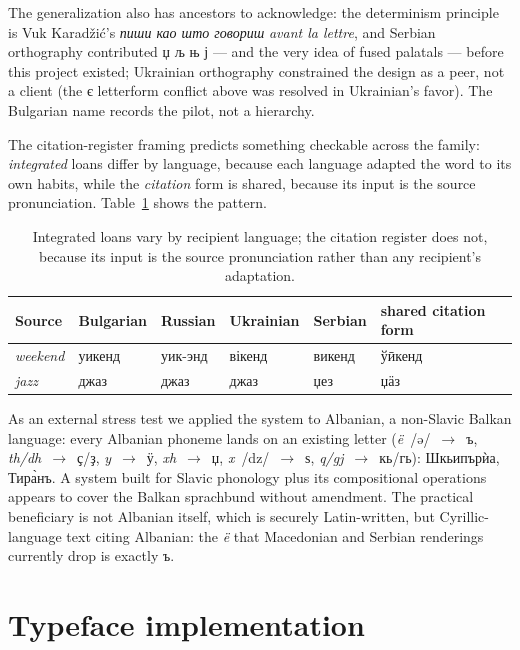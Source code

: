 \documentclass[11pt]{article}
\newcommand{\cz}[1]{{\chu #1}}
\newcommand{\ph}[1]{{\ipafont/#1/}}
\begin{document}
The generalization also has ancestors to acknowledge: the determinism principle is Vuk Karad\v{z}i\'c's \emph{пиши као што говориш} \emph{avant la lettre}, and Serbian orthography contributed \cz{џ љ њ ј} — and the very idea of fused palatals — before this project existed; Ukrainian orthography constrained the design as a peer, not a client (the є letterform conflict above was resolved in Ukrainian's favor). The Bulgarian name records the pilot, not a hierarchy.

The citation-register framing predicts something checkable across the family: \emph{integrated} loans differ by language, because each language adapted the word to its own habits, while the \emph{citation} form is shared, because its input is the source pronunciation. Table~\ref{tab:multibase} shows the pattern.

\begin{table}[ht]\centering\small
\begin{tabular}{llllll}
\toprule
Source & Bulgarian & Russian & Ukrainian & Serbian & shared citation form \\
\midrule
\emph{weekend} & \cz{уикенд} & \cz{уик-энд} & \cz{вікенд} & \cz{викенд} & \cz{ўӣкенд} \\
\emph{jazz} & \cz{джаз} & \cz{джаз} & \cz{джаз} & \cz{џез} & \cz{џӓз} \\
\bottomrule
\end{tabular}
\caption{Integrated loans vary by recipient language; the citation register does not, because its input is the source pronunciation rather than any recipient's adaptation.}
\label{tab:multibase}
\end{table}

As an external stress test we applied the system to Albanian, a non-Slavic Balkan language: every Albanian phoneme lands on an existing letter (\emph{ë}~\ph{ə}~$\rightarrow$~\cz{ъ}, \emph{th/dh}~$\rightarrow$~\cz{ҫ}/\cz{ҙ}, \emph{y}~$\rightarrow$~\cz{ӱ}, \emph{xh}~$\rightarrow$~\cz{џ}, \emph{x}~\ph{dz}~$\rightarrow$~\cz{ѕ}, \emph{q/gj}~$\rightarrow$~\cz{кь}/\cz{гь}): \cz{Шкьипърѝа}, \cz{Тира̀нъ}. A system built for Slavic phonology plus its compositional operations appears to cover the Balkan sprachbund without amendment. The practical beneficiary is not Albanian itself, which is securely Latin-written, but Cyrillic-language text citing Albanian: the \emph{ë} that Macedonian and Serbian renderings currently drop is exactly \cz{ъ}.

\section{Typeface implementation}
\end{document}
